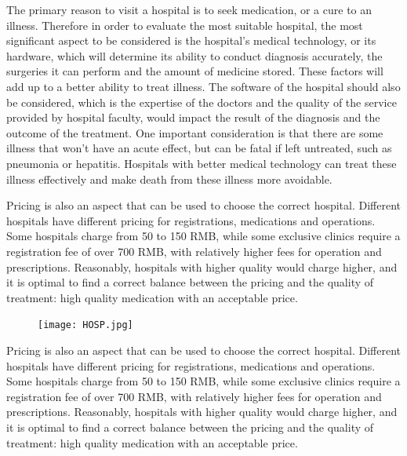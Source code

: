 \documentclass{article}
\begin{document}
The primary reason to visit a hospital is to seek medication, or a cure to an illness. Therefore in order to evaluate the most suitable hospital, the most significant aspect to be considered is the hospital’s medical technology, or its hardware, which will determine its ability to conduct diagnosis accurately, the surgeries it can perform and the amount of medicine stored. These factors will add up to a better ability to treat illness. The software of the hospital should also be considered, which is the expertise of the doctors and the quality of the service provided by hospital faculty, would impact the result of the diagnosis and the outcome of the treatment. One important consideration is that there are some illness that won’t have an acute effect, but can be fatal if left untreated, such as pneumonia or hepatitis. Hospitals with better medical technology can treat these illness effectively and make death from these illness more avoidable. 

Pricing is also an aspect that can be used to choose the correct hospital. Different hospitals have different pricing for registrations, medications and operations. Some hospitals charge from 50 to 150 RMB, while some exclusive clinics require a registration fee of over 700 RMB, with relatively higher fees for operation and prescriptions. Reasonably, hospitals with higher quality would charge higher, and it is optimal to find a correct balance between the pricing and the quality of treatment: high quality medication with an acceptable price.

\begin{figure}[htbp]
    \begin{minipage}[t]{0.45\textwidth}
        \centering
        \texttt{[image: HOSP.jpg]}
    \end{minipage}
\end{figure}

Pricing is also an aspect that can be used to choose the correct hospital. Different hospitals have different pricing for registrations, medications and operations. Some hospitals charge from 50 to 150 RMB, while some exclusive clinics require a registration fee of over 700 RMB, with relatively higher fees for operation and prescriptions. Reasonably, hospitals with higher quality would charge higher, and it is optimal to find a correct balance between the pricing and the quality of treatment: high quality medication with an acceptable price.
\end{document}
